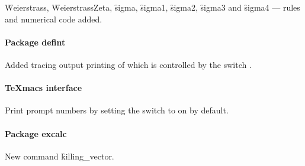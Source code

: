 \f{Weierstrass}, \f{WeierstrassZeta}, \f{sigma}, \f{sigma1}, \f{sigma2},
\f{sigma3} and \f{sigma4}  --- rules and numerical code added.

\paragraph{Package defint}

Added tracing output printing of which is controlled by the switch .

\paragraph{TeXmacs interface}

Print prompt numbers by setting the switch  to on by default.

\paragraph{Package excalc}

New command \f{killing\_vector}.
